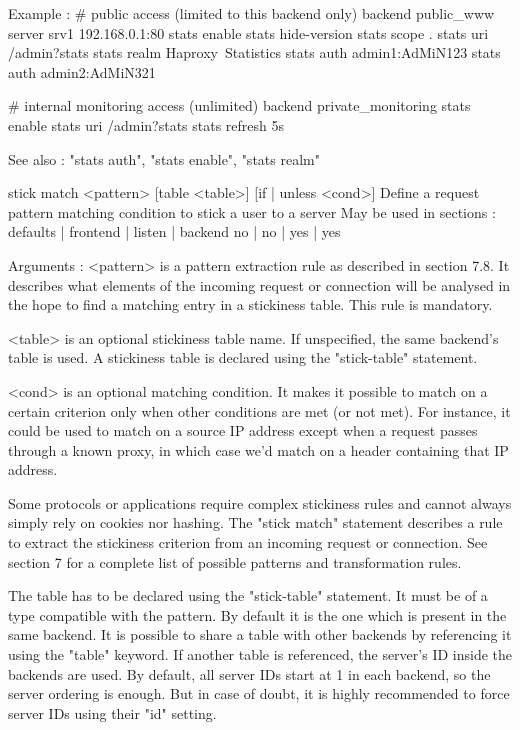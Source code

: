   Example :
    # public access (limited to this backend only)
    backend public_www
        server srv1 192.168.0.1:80
        stats enable
        stats hide-version
        stats scope   .
        stats uri     /admin?stats
        stats realm   Haproxy\ Statistics
        stats auth    admin1:AdMiN123
        stats auth    admin2:AdMiN321

    # internal monitoring access (unlimited)
    backend private_monitoring
        stats enable
        stats uri     /admin?stats
        stats refresh 5s

  See also : "stats auth", "stats enable", "stats realm"


stick match <pattern> [table <table>] [{if | unless} <cond>]
  Define a request pattern matching condition to stick a user to a server
  May be used in sections :   defaults | frontend | listen | backend
                                 no    |    no    |   yes  |   yes

  Arguments :
    <pattern>  is a pattern extraction rule as described in section 7.8. It
               describes what elements of the incoming request or connection
               will be analysed in the hope to find a matching entry in a
               stickiness table. This rule is mandatory.

    <table>    is an optional stickiness table name. If unspecified, the same
               backend's table is used. A stickiness table is declared using
               the "stick-table" statement.

    <cond>     is an optional matching condition. It makes it possible to match
               on a certain criterion only when other conditions are met (or
               not met). For instance, it could be used to match on a source IP
               address except when a request passes through a known proxy, in
               which case we'd match on a header containing that IP address.

  Some protocols or applications require complex stickiness rules and cannot
  always simply rely on cookies nor hashing. The "stick match" statement
  describes a rule to extract the stickiness criterion from an incoming request
  or connection. See section 7 for a complete list of possible patterns and
  transformation rules.

  The table has to be declared using the "stick-table" statement. It must be of
  a type compatible with the pattern. By default it is the one which is present
  in the same backend. It is possible to share a table with other backends by
  referencing it using the "table" keyword. If another table is referenced,
  the server's ID inside the backends are used. By default, all server IDs
  start at 1 in each backend, so the server ordering is enough. But in case of
  doubt, it is highly recommended to force server IDs using their "id" setting.

